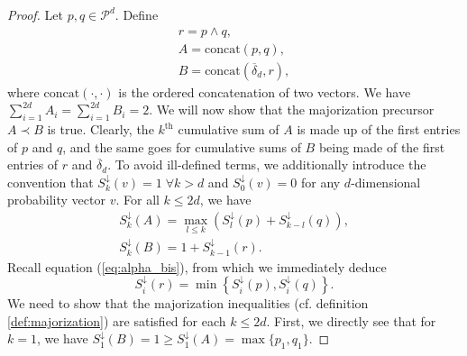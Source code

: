 \begin{proof}
    Let $p, q \in \mathcal{P}^d$. Define 
    \begin{gather}
        r = p \wedge q,\\
        A = \text{concat}(p, q),\\
        B = \text{concat}(\overline{\delta}_d, r),
    \end{gather}
    where $\text{concat}(\cdot, \cdot)$ is the ordered concatenation of two vectors. We have $\sum_{i=1}^{2d} A_i = \sum_{i=1}^{2d} B_i = 2$. We will now show that the majorization precursor $A \prec B$ is true. Clearly, the $k^{\text{th}}$ cumulative sum of $A$ is made up of the first entries of $p$ and $q$, and the same goes for cumulative sums of $B$ being made of the first entries of $r$ and $\overline{\delta}_d$. To avoid ill-defined terms, we additionally introduce the convention that $S^\downarrow_k (v) = 1 \; \forall k > d$ and $S^\downarrow_0(v) = 0$ for any $d$-dimensional probability vector $v$. For all $k \leq 2d$, we have
    \begin{gather}
        S^\downarrow_k (A) = \max_{l\leq k} \left(S^\downarrow_l (p) + S^\downarrow_{k-l} (q)\right), \\
        S^\downarrow_k (B) = 1 + S^\downarrow_{k-1}(r).
    \end{gather} %
    Recall equation (\ref{eq:alpha_bis}), from which we immediately deduce
    \begin{equation}
        S^\downarrow_i (r) = \min \left\{S^\downarrow_i (p), S^\downarrow_i (q)\right\}.
    \end{equation}
    We need to show that the majorization inequalities (cf. definition \ref{def:majorization}) are satisfied for each $k \leq 2d$. First, we directly see that for $k = 1$, we have $S^\downarrow_1(B) = 1 \geq S^\downarrow_1(A) = \max \{p_1, q_1\}$. 
    

\end{proof}
